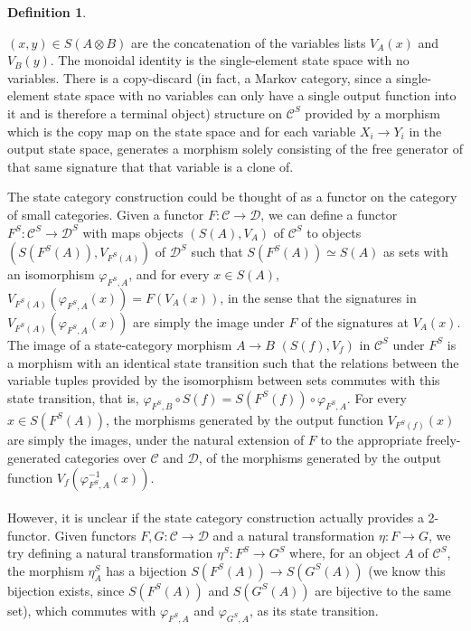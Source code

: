 \documentclass{article}
\theoremstyle{definition}
\newtheorem{definition}{Definition}[section]
\theoremstyle{remark}
\begin{document}
\begin{definition}
\begin{itemize}
    $(x,y) \in S(A\otimes B)$ are the concatenation of
    the variables lists $V_A(x)$ and $V_B(y)$. The monoidal identity
    is the single-element state space with no variables. There is a
    copy-discard (in fact, a Markov category, since a single-element
    state space with no variables can only have a single output
    function into it and is therefore a terminal object) structure
    on $\mathcal{C}^S$ provided by a morphism which is the copy map
    on the state space and for each variable $X_i\to Y_i$ in
    the output state space, generates a morphism solely consisting
    of the free generator of that same signature that that variable
    is a clone of.
\end{itemize}

The state category construction could be thought of as a
functor on the category of small categories.
Given a functor $F:\mathcal{C}\to\mathcal{D}$,
we can define a functor $F^S:\mathcal{C}^S\to\mathcal{D}^S$
with maps objects $(S(A),V_A)$ of $\mathcal{C}^S$ to
objects $(S(F^S(A)),V_{F^S(A)})$ of $\mathcal{D}^S$ such that
$S(F^S(A)) \simeq S(A)$ as sets with an
isomorphism $\varphi_{F^S,A}$, and for every $x \in S(A)$,
$V_{F^S(A)}(\varphi_{F^S,A}(x))= F(V_A(x))$, in the sense that the
signatures in
$V_{F^S(A)}(\varphi_{F^S,A}(x))$
are simply the image under $F$ of the signatures
at $V_A(x)$. The image of a state-category morphism $A\to B$
$(S(f),V_f)$ in $\mathcal{C}^S$ under $F^S$ is a morphism
with an identical state transition such that the relations between
the variable tuples provided by the isomorphism between sets
commutes with this state transition, that is,
$\varphi_{F^S,B} \circ S(f) = S(F^S(f)) \circ \varphi_{F^S,A}$.
For every $x\in S(F^S(A))$, the
morphisms generated by the output function $V_{F^S(f)}(x)$
are simply the images, under the natural extension of $F$ to the
appropriate freely-generated categories over $\mathcal{C}$
and $\mathcal{D}$, of the morphisms generated by the output function
$V_{f}(\varphi_{F^S,A}^{-1}(x))$.
\\ \\
However, it is unclear if
the state category construction actually
provides a 2-functor. Given functors $F,G:\mathcal{C}
\to\mathcal{D}$ and a natural transformation $\eta:F\to G$, we
try defining a natural transformation $\eta^S:F^S\to G^S$ where,
for an object $A$ of $\mathcal{C}^S$, the morphism
$\eta^S_A$ has a bijection $S(F^S(A)) \to
S(G^S(A))$ (we know this bijection exists, since
$S(F^S(A))$ and $S(G^S(A))$ are bijective to the
same set), which commutes with
$\varphi_{F^S,A}$ and $\varphi_{G^S,A}$, as its state transition.

\end{definition}
\end{document}
